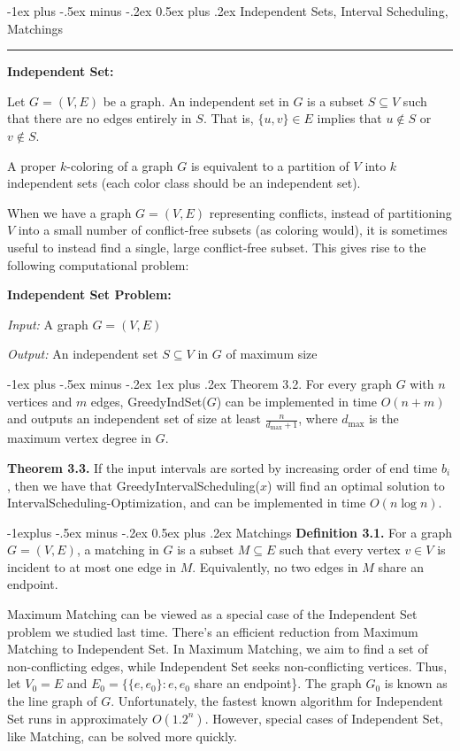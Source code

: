 \documentclass[10pt,landscape]{article}
\makeatletter
\renewcommand{\section}{\@startsection{section}{1}{0mm}%
                                {-1ex plus -.5ex minus -.2ex}%
                                {0.5ex plus .2ex}%
                                {\normalfont\large\bfseries}}
\renewcommand{\subsection}{\@startsection{subsection}{2}{0mm}%
                                {-1explus -.5ex minus -.2ex}%
                                {0.5ex plus .2ex}%
                                {\normalfont\normalsize\bfseries}}
\renewcommand{\subsubsection}{\@startsection{subsubsection}{3}{0mm}%
                                {-1ex plus -.5ex minus -.2ex}%
                                {1ex plus .2ex}%
                                {\normalfont\small\bfseries}}
\makeatother
\begin{document}
\begin{multicols*}{3}
\section{Independent Sets, Interval Scheduling, Matchings}\smallskip \hrule height 2pt \smallskip
\textbf{Independent Set:}

Let $G = (V, E)$ be a graph. An independent set in $G$ is a subset $S \subseteq V$ such that there are no edges entirely in $S$. That is, $\{u, v\} \in E$ implies that $u \notin S$ or $v \notin S$.

A proper $k$-coloring of a graph $G$ is equivalent to a partition of $V$ into $k$ independent sets (each color class should be an independent set).

When we have a graph $G = (V, E)$ representing conflicts, instead of partitioning $V$ into a small number of conflict-free subsets (as coloring would), it is sometimes useful to instead find a single, large conflict-free subset. This gives rise to the following computational problem:

\textbf{Independent Set Problem:}

\textit{Input:} A graph $G = (V, E)$

\textit{Output:} An independent set $S \subseteq V$ in $G$ of maximum size

\subsubsection{Theorem 3.2.} For every graph $G$ with $n$ vertices and $m$ edges, GreedyIndSet($G$) can be implemented in time $O(n + m)$ and outputs an independent set of size at least $\frac{n}{d_{\text{max}} + 1}$, where $d_{\text{max}}$ is the maximum vertex degree in $G$.

\textbf{Theorem 3.3.} If the input intervals are sorted by increasing order of end time $b_i$, then we have that GreedyIntervalScheduling($x$) will find an optimal solution to IntervalScheduling-Optimization, and can be implemented in time $O(n \log n)$.

\subsection{Matchings}
\textbf{Definition 3.1.} For a graph $G = (V, E)$, a matching in $G$ is a subset $M \subseteq E$ such that every vertex $v \in V$ is incident to at most one edge in $M$. Equivalently, no two edges in $M$ share an endpoint.

\smallskip 
Maximum Matching can be viewed as a special case of the Independent Set problem we studied last time. There's an efficient reduction from Maximum Matching to Independent Set. In Maximum Matching, we aim to find a set of non-conflicting edges, while Independent Set seeks non-conflicting vertices. Thus, let $V_0 = E$ and $E_0 = \{\{e, e_0\} : e, e_0$ share an endpoint\}. The graph $G_0$ is known as the line graph of $G$. Unfortunately, the fastest known algorithm for Independent Set runs in approximately $O(1.2^n)$. However, special cases of Independent Set, like Matching, can be solved more quickly.


\end{multicols*}
\end{document}
